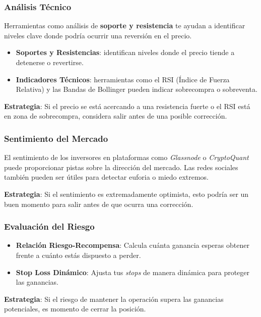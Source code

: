 \documentclass[12pt]{article}
\begin{document}
        \subsubsection{Análisis Técnico}
            Herramientas como análisis de \textbf{soporte y resistencia} te ayudan a identificar niveles clave donde podría ocurrir una reversión en el precio.
            \begin{itemize}
                \item \textbf{Soportes y Resistencias}: identifican niveles donde el precio tiende a detenerse o revertirse.
                \item \textbf{Indicadores Técnicos}: herramientas como el RSI (Índice de Fuerza Relativa) y las Bandas de Bollinger pueden indicar sobrecompra o sobreventa.
            \end{itemize}

            \textbf{Estrategia}: Si el precio se está acercando a una resistencia fuerte o el RSI está en zona de sobrecompra, considera salir antes de una posible corrección.

        \subsubsection{Sentimiento del Mercado}
            El sentimiento de los inversores en plataformas como \textit{Glassnode} o \textit{CryptoQuant} puede proporcionar pistas sobre la dirección del mercado. Las redes sociales también pueden ser útiles para detectar euforia o miedo extremos.

            \textbf{Estrategia}: Si el sentimiento es extremadamente optimista, esto podría ser un buen momento para salir antes de que ocurra una corrección.

        \subsubsection{Evaluación del Riesgo}
            \begin{itemize}
                \item \textbf{Relación Riesgo-Recompensa}: Calcula cuánta ganancia esperas obtener frente a cuánto estás dispuesto a perder.
                \item \textbf{Stop Loss Dinámico}: Ajusta tus \textit{stops} de manera dinámica para proteger las ganancias.
            \end{itemize}

            \textbf{Estrategia}: Si el riesgo de mantener la operación supera las ganancias potenciales, es momento de cerrar la posición.
\end{document}
